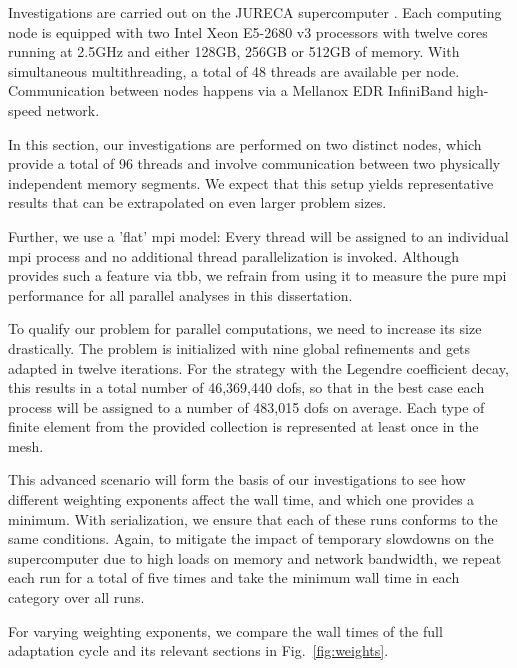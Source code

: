 
Investigations are carried out on the JURECA supercomputer \parencite{krause2016}. Each computing node is equipped with two Intel Xeon E5-2680 v3 processors with twelve cores running at 2.5GHz and either 128GB, 256GB or 512GB of memory. With simultaneous multithreading, a total of 48 threads are available per node. Communication between nodes happens via a Mellanox EDR InfiniBand high-speed network.

In this section, our investigations are performed on two distinct nodes, which provide a total of 96 threads and involve communication between two physically independent memory segments. We expect that this setup yields representative results that can be extrapolated on even larger problem sizes.

Further, we use a 'flat' \gls{mpi} model: Every thread will be assigned to an individual \gls{mpi} process and no additional thread parallelization is invoked. Although \dealii{} provides such a feature via \gls{tbb}, we refrain from using it to measure the pure \gls{mpi} performance for all parallel analyses in this dissertation.


To qualify our problem for parallel computations, we need to increase its size drastically. The problem is initialized with nine global refinements and gets adapted in twelve iterations. For the strategy with the Legendre coefficient decay, this results in a total number of 46,369,440 \glspl{dof}, so that in the best case each process will be assigned to a number of 483,015 \glspl{dof} on average. Each type of finite element from the provided collection is represented at least once in the mesh.

This advanced scenario will form the basis of our investigations to see how different weighting exponents affect the wall time, and which one provides a minimum. With serialization, we ensure that each of these runs conforms to the same conditions. Again, to mitigate the impact of temporary slowdowns on the supercomputer due to high loads on memory and network bandwidth, we repeat each run for a total of five times and take the minimum wall time in each category over all runs.


For varying weighting exponents, we compare the wall times of the full adaptation cycle and its relevant sections
in Fig.~\ref{fig:weights}.

